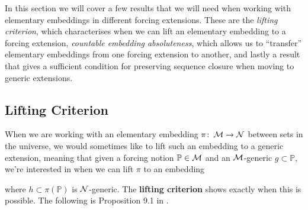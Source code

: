 \documentclass[../../main]{subfiles}
\begin{document}
In this section we will cover a few results that we will need when working with elementary embeddings in different forcing extensions. These are the \textit{lifting criterion}, which characterises when we can lift an elementary embedding to a forcing extension, \textit{countable embedding absoluteness}, which allows us to ``transfer'' elementary embeddings from one forcing extension to another, and lastly a result that gives a sufficient condition for preserving sequence closure when moving to generic extensions.

\subsection{Lifting Criterion}
When we are working with an elementary embedding $\pi\colon\operatorname{\mathcal M}\to\operatorname{\mathcal N}$ between sets in the universe, we would sometimes like to lift such an embedding to a generic extension, meaning that given a forcing notion $\mathbb P\in\operatorname{\mathcal M}$ and an $\operatorname{\mathcal M}$-generic $g\subset\mathbb P$, we're interested in when we can lift $\pi$ to an embedding
\eq{
  \pi^+\colon\M[g]\to\N[h],
}

where $h\subset\pi(\mathbb P)$ is $\operatorname{\mathcal N}$-generic. The \textbf{lifting criterion} shows exactly when this is possible. The following is Proposition 9.1 in \cite{handbook-cummings}.

\end{document}
